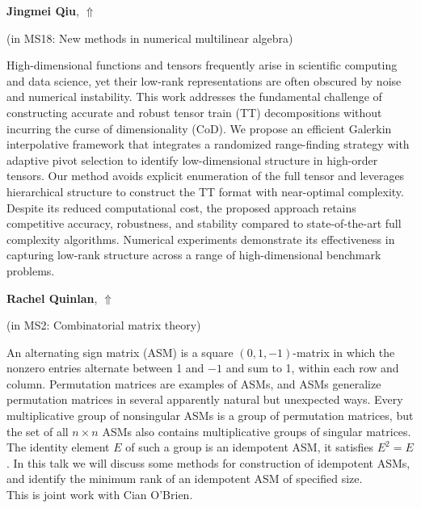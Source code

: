 \documentclass[ILAS2025-program.tex]{subfiles}
\begin{document}
\hypertarget{down0149}{}\begin{ilasabstract}
    
\textbf{Jingmei Qiu},  \hfill \hyperlink{up0149}{$\Uparrow$}
    
    
(in {\color{mstitle}MS18: New methods in numerical multilinear algebra})
        
\mtskip
    High-dimensional functions and tensors frequently arise in scientific computing and data science, yet their low-rank representations are often obscured by noise and numerical instability. This work addresses the fundamental challenge of constructing accurate and robust tensor train (TT) decompositions without incurring the curse of dimensionality (CoD). We propose an efficient Galerkin interpolative framework that integrates a randomized range-finding strategy with adaptive pivot selection to identify low-dimensional structure in high-order tensors. Our method avoids explicit enumeration of the full tensor and leverages hierarchical structure to construct the TT format with near-optimal complexity. Despite its reduced computational cost, the proposed approach retains competitive accuracy, robustness, and stability compared to state-of-the-art full complexity algorithms. Numerical experiments demonstrate its effectiveness in capturing low-rank structure across a range of high-dimensional benchmark problems.

\end{ilasabstract}
    

\hypertarget{down0141}{}\begin{ilasabstract}
    
\textbf{Rachel Quinlan},  \hfill \hyperlink{up0141}{$\Uparrow$}
    
    
(in {\color{mstitle}MS2: Combinatorial matrix theory})
        
\mtskip
    An alternating sign matrix (ASM) is a square $(0,1,-1)$-matrix in which the nonzero entries alternate between 1 and $-1$ and sum to 1, within each row and column. Permutation matrices are examples of ASMs, and ASMs generalize permutation matrices in several apparently natural but unexpected ways. Every multiplicative group of nonsingular ASMs is a group of permutation matrices, but the set of all $n\times n$ ASMs also contains multiplicative groups of singular matrices. The identity element $E$ of such a group is an idempotent ASM, it satisfies $E^2=E$. In this talk we will discuss some methods for construction of idempotent ASMs, and identify the minimum rank of an idempotent ASM of specified size. \\
This is joint work with Cian O'Brien.

\end{ilasabstract}
    
\end{document}
